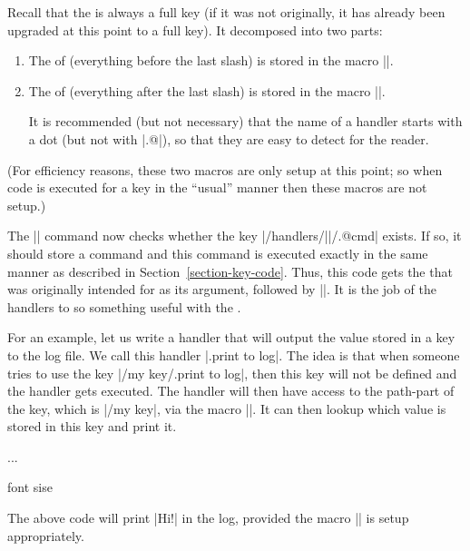 Recall that the  is always a full key (if it was not
originally, it has already been upgraded at this point to a full
key). It decomposed into  two parts:

\begin{enumerate}
\item The  of  (everything
  before the last slash) is stored in the macro |\pgfkeyscurrentpath|.
\item The  of  (everything
  after the last slash) is stored in the macro |\pgfkeyscurrentname|.

  It is recommended (but not necessary) that the name of a handler
  starts with a dot (but not with |.@|), so that they are easy to
  detect for the reader.  
\end{enumerate}

(For efficiency reasons, these two macros are only setup at this point;
so when code is executed for a key in the ``usual'' manner then these
macros are not setup.)

The |\pgfkeys| command now checks whether the key
|/handlers/||/.@cmd| exists. If so, it should store a command
and this command is executed exactly in the same manner as described
in Section~\ref{section-key-code}.
Thus, this code gets the  that was originally intended for
 as its argument, followed by |\pgfeov|.
It is the job of the handlers to so something useful with the
.

For an example, let us write a handler that will output the value
stored in a key to the log file. We call this handler
|.print to log|. The idea is that when someone tries to use the key
|/my key/.print to log|, then this key will not be defined and the
handler gets executed. The handler will then have access to the
path-part of the key, which is |/my key|, via the macro
|\pgfkeyscurrentpath|. It can then lookup which value is stored in
this key and print it.

\begin{codeexample}
{%
  \pgfkeysgetvalue{\pgfkeyscurrentpath}{\temp}
  \writetolog{\temp}
}
...


font sise
\end{codeexample}
The above code will print |Hi!| in the log, provided the macro
|\writetolog| is setup appropriately.

